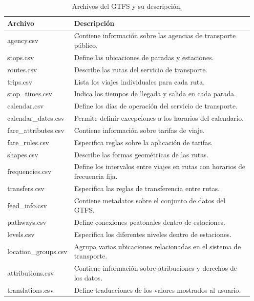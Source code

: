 \begin{table}[H]
    \centering
    \begin{tabular}{|l|p{10cm}|}
        \hline
        \textbf{Archivo} & \textbf{Descripción} \\
        \hline
        agency.csv & Contiene información sobre las agencias de transporte público. \\
        stops.csv & Define las ubicaciones de paradas y estaciones. \\
        routes.csv & Describe las rutas del servicio de transporte. \\
        trips.csv & Lista los viajes individuales para cada ruta. \\
        stop\_times.csv & Indica los tiempos de llegada y salida en cada parada. \\
        calendar.csv & Define los días de operación del servicio de transporte. \\
        calendar\_dates.csv & Permite definir excepciones a los horarios del calendario. \\
        fare\_attributes.csv & Contiene información sobre tarifas de viaje. \\
        fare\_rules.csv & Especifica reglas sobre la aplicación de tarifas. \\
        shapes.csv & Describe las formas geométricas de las rutas. \\
        frequencies.csv & Define los intervalos entre viajes en rutas con horarios de frecuencia fija. \\
        transfers.csv & Especifica las reglas de transferencia entre rutas. \\
        feed\_info.csv & Contiene metadatos sobre el conjunto de datos del GTFS. \\
        pathways.csv & Define conexiones peatonales dentro de estaciones. \\
        levels.csv & Especifica los diferentes niveles dentro de estaciones. \\
        location\_groups.csv & Agrupa varias ubicaciones relacionadas en el sistema de transporte. \\
        attributions.csv & Contiene información sobre atribuciones y derechos de los datos. \\
        translations.csv & Define traducciones de los valores mostrados al usuario. \\
        \hline
    \end{tabular}
    \caption{Archivos del GTFS y su descripción.}
    \label{tab:gtfs_files_apendice}
\end{table}
